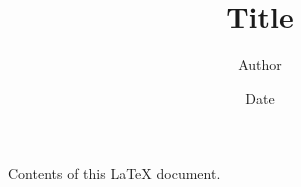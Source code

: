 \documentclass{article}
\title{Title}
\author{Author}
\date{Date}
\begin{document}
	\maketitle
	Contents of this \LaTeX{} document.
\end{document}
